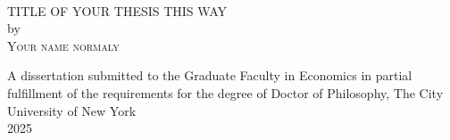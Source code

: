 \begin{titlepage}

\begin{center}

~\vspace{2in}

\textsc{TITLE OF YOUR THESIS THIS WAY} \\[0.5in]
by \\[0.5in]
\textsc{Your name normaly} 

\vspace{\fill}
A dissertation submitted to the Graduate Faculty in Economics in partial fulfillment of the requirements for the degree of Doctor of Philosophy, The City University of New York \\[0.25in]
2025

\end{center}

\end{titlepage}
